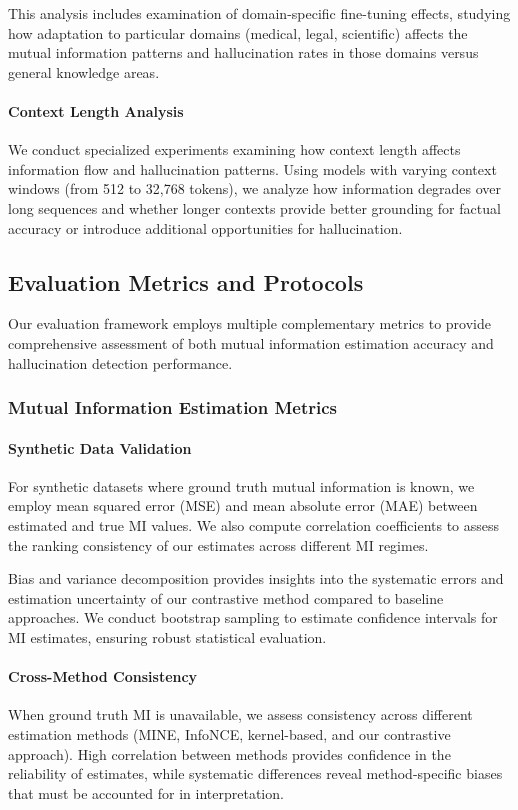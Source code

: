 This analysis includes examination of domain-specific fine-tuning effects, studying how adaptation to particular domains (medical, legal, scientific) affects the mutual information patterns and hallucination rates in those domains versus general knowledge areas.

\paragraph{Context Length Analysis}
We conduct specialized experiments examining how context length affects information flow and hallucination patterns. Using models with varying context windows (from 512 to 32,768 tokens), we analyze how information degrades over long sequences and whether longer contexts provide better grounding for factual accuracy or introduce additional opportunities for hallucination.

\subsection{Evaluation Metrics and Protocols}
\label{subsec:evaluation_metrics}

Our evaluation framework employs multiple complementary metrics to provide comprehensive assessment of both mutual information estimation accuracy and hallucination detection performance.

\subsubsection{Mutual Information Estimation Metrics}

\paragraph{Synthetic Data Validation}
For synthetic datasets where ground truth mutual information is known, we employ mean squared error (MSE) and mean absolute error (MAE) between estimated and true MI values. We also compute correlation coefficients to assess the ranking consistency of our estimates across different MI regimes.

Bias and variance decomposition provides insights into the systematic errors and estimation uncertainty of our contrastive method compared to baseline approaches. We conduct bootstrap sampling to estimate confidence intervals for MI estimates, ensuring robust statistical evaluation.

\paragraph{Cross-Method Consistency}
When ground truth MI is unavailable, we assess consistency across different estimation methods (MINE, InfoNCE, kernel-based, and our contrastive approach). High correlation between methods provides confidence in the reliability of estimates, while systematic differences reveal method-specific biases that must be accounted for in interpretation.

